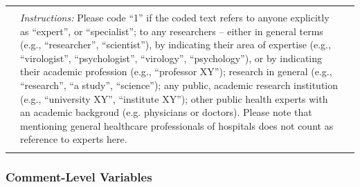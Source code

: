 \documentclass[
]{ccr}
\begin{document}
{\begin{spacing}{1}
\begin{longtable}[]{@{}
  >{\raggedright\arraybackslash}p{.14\linewidth}
  >{\raggedright\arraybackslash}p{.62\linewidth}
  >{\raggedright\arraybackslash}p{.13\linewidth}@{}}
&
\\
&
\emph{Instructions:} \newline
Please code “1” if the coded text refers to anyone explicitly as “expert”, or “specialist”; to any researchers – either in general terms (e.g., “researcher”, “scientist”), by indicating their area of expertise (e.g., “virologist”, “psychologist”, “virology”, “psychology”), or by indicating their academic profession (e.g., “professor XY”); research in general (e.g., “research”, “a study”, “science”); any public, academic research institution (e.g., “university XY”, “institute XY”); other public health experts with an academic backgroud (e.g. physicians or doctors).  
Please note that mentioning general healthcare professionals of hospitals does not count as reference to experts here.
&
\\
\midrule\noalign{}
\end{longtable}
\end{spacing}
}

\hypertarget{comment-level-variables}{%
\subsubsection{Comment-Level Variables}\label{comment-level-variables}}
\end{document}
